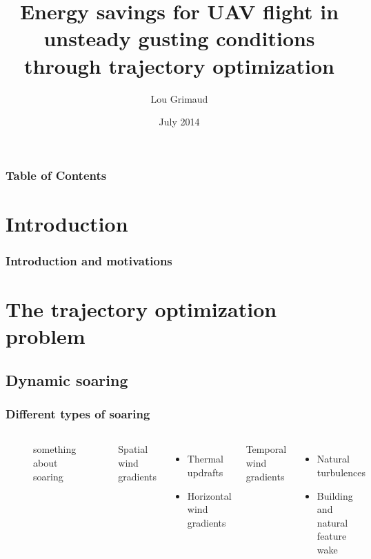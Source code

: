 \documentclass[compress]{beamer}
\title[Trajectory optimization]{Energy savings for UAV flight in unsteady gusting conditions \\
through trajectory optimization }
\author{Lou Grimaud} %
\institute{Illinois Institute of Technology} %
\date{July 2014} %
\begin{document}


\frame{\titlepage}

\begin{frame}
  \frametitle{Table of Contents}
  \tableofcontents
\end{frame}

\section{Introduction}
\begin{frame}
  \frametitle{Introduction and motivations}

\end{frame}

\section[Trajectory optimization]{The trajectory optimization problem}

\subsection{Dynamic soaring}

\begin{frame}
    \frametitle{Different types of soaring}
  \begin{columns}
    \begin{figure}[h]
      \centering
      \caption{something about soaring}
    \end{figure}
    {\Large Spatial wind gradients}
    \begin{itemize}
      \item Thermal updrafts
      \item Horizontal wind gradients
    \end{itemize}
    {\Large Temporal wind gradients}
    \begin{itemize}
      \item Natural turbulences
      \item Building and natural feature wake
    \end{itemize}
  \end{columns}
\end{frame}
\end{document}
